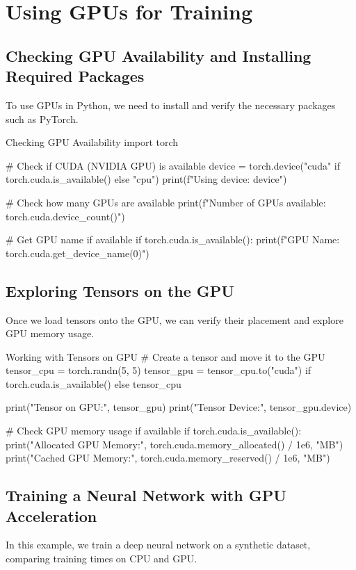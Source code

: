 
%
\section{Using GPUs for Training}
\subsection{Checking GPU Availability and Installing Required Packages}
To use GPUs in Python, we need to install and verify the necessary packages such as PyTorch.

\begin{codeonly}{Checking GPU Availability}
import torch

# Check if CUDA (NVIDIA GPU) is available
device = torch.device("cuda" if torch.cuda.is_available() else "cpu")
print(f"Using device: {device}")

# Check how many GPUs are available
print(f"Number of GPUs available: {torch.cuda.device_count()}")

# Get GPU name if available
if torch.cuda.is_available():
    print(f"GPU Name: {torch.cuda.get_device_name(0)}")
\end{codeonly}

\subsection{Exploring Tensors on the GPU}
Once we load tensors onto the GPU, we can verify their placement and explore GPU memory usage.

\begin{codeonly}{Working with Tensors on GPU}
# Create a tensor and move it to the GPU
tensor_cpu = torch.randn(5, 5)
tensor_gpu = tensor_cpu.to("cuda") if torch.cuda.is_available() else tensor_cpu

print("Tensor on GPU:", tensor_gpu)
print("Tensor Device:", tensor_gpu.device)

# Check GPU memory usage if available
if torch.cuda.is_available():
    print("Allocated GPU Memory:", torch.cuda.memory_allocated() / 1e6, "MB")
    print("Cached GPU Memory:", torch.cuda.memory_reserved() / 1e6, "MB")
\end{codeonly}


\subsection{Training a Neural Network with GPU Acceleration}
In this example, we train a deep neural network on a synthetic dataset, comparing training times on CPU and GPU.

